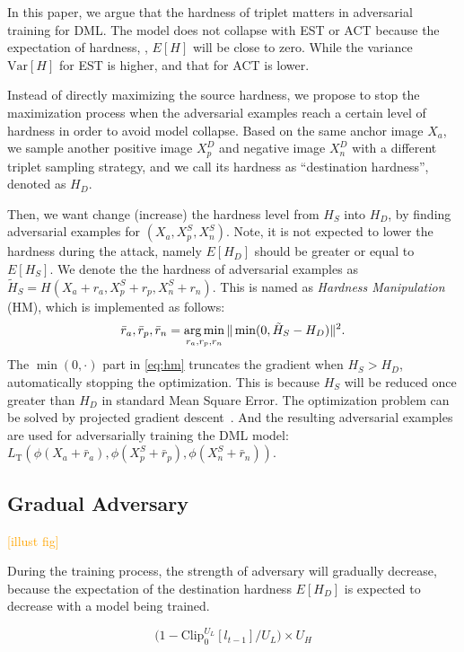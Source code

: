 \documentclass[10pt,twocolumn,letterpaper]{article}
\newcommand{\oo}[1]{\textcolor{orange}{#1}}
\begin{document}
In this paper, we argue that the hardness of triplet matters in adversarial
training for DML.
%
The model does not collapse with EST or ACT because the expectation of hardness,
\ie, $E[H]$ will be close to zero.
%
While the variance $\text{Var}[H]$ for EST is higher, and that for ACT is lower.

Instead of directly maximizing the source hardness, we propose to stop the
maximization process when the adversarial examples reach a certain level of
hardness in order to avoid model collapse.
%
Based on the same anchor image $X_a$, we sample another positive image $X_p^D$
and negative image $X_n^D$ with a different triplet sampling strategy, and
we call its hardness as ``destination hardness'', denoted as $H_D$.

Then, we want change (increase) the hardness level from $H_S$ into $H_D$, by
finding adversarial examples for $(X_a, X_p^S, X_n^S)$.
%
Note, it is not expected to lower the hardness during the attack, namely
$E[H_D]$ should be greater or equal to $E[H_S]$.
%
We denote the the hardness of adversarial examples as $\tilde{H}_S=H(X_a{+}r_a,
X_p^S{+}r_p, X_n^S{+}r_n)$.
%
This is named as \emph{Hardness Manipulation} (HM), which is implemented as
follows:
%
\begin{equation}
	\bar{r}_a, \bar{r}_p, \bar{r}_n = \operatorname*{arg\,min}_{r_a,r_p,r_n} \|\min(0,
	\tilde{H}_S-H_D)\|^2.
	\label{eq:hm}
\end{equation}
%
The $\min(0,\cdot)$ part in \cref{eq:hm} truncates the gradient when $H_S>H_D$,
automatically stopping the optimization.
%
This is because $H_S$ will be reduced once greater than $H_D$ in standard Mean
Square Error.
%
The optimization problem can be solved by projected gradient
descent~\cite{madry}.
%
And the resulting adversarial examples are used for adversarially training the
DML model:
%
$L_\text{T}(\phi(X_a+\bar{r}_a), \phi(X_p^S+\bar{r}_p),
\phi(X_n^S+\bar{r}_n))$.

\subsection{Gradual Adversary}

\oo{[illust fig]}

During the training process, the strength of adversary will gradually decrease,
because the expectation of the destination hardness $E[H_D]$ is expected to
decrease with a model being trained.


\[
	\big(1-\text{Clip}_0^{U_L}[l_{t-1}]/U_L \big)\times
	U_H
\]
\end{document}
